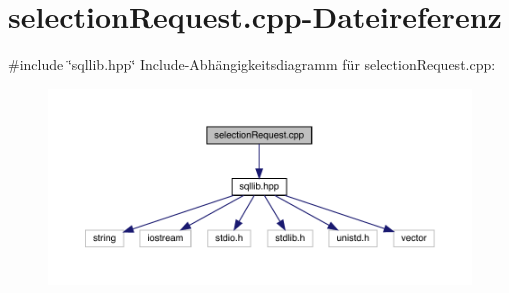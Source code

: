 \section{selection\+Request.\+cpp-\/\+Dateireferenz}
\label{selection_request_8cpp}
{\ttfamily \#include \char`\"{}sqllib.\+hpp\char`\"{}}\newline
Include-\/\+Abhängigkeitsdiagramm für selection\+Request.\+cpp\+:\nopagebreak
\begin{figure}[H]
\begin{center}
\leavevmode
\includegraphics[width=350pt]{selection_request_8cpp__incl}
\end{center}
\end{figure}
